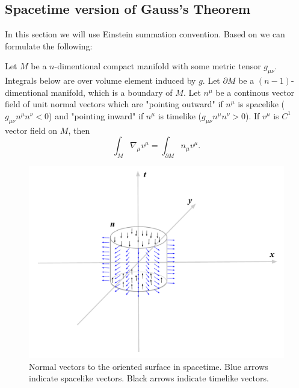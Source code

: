 \documentclass[main.tex]{subfiles}
\begin{document}
\subsection{Spacetime version of Gauss's Theorem}
In this section we will use Einstein summation convention.
Based on \cite[see][Appendix B]{wald1984} we can formulate the following:
\begin{theorem}
\label{guass-theorem-relativistic}
Let $M$ be a $n$-dimentional compact manifold with some metric tensor $g_{\mu\nu}$. Integrals below are over volume element induced by $g$. Let $\partial M$ be a $(n-1)$-dimentional manifold, which is a boundary of $M$. Let $n^\mu$ be a continous vector field of unit normal vectors which are "pointing outward" if $n^\mu$ is spacelike ($g_{\mu\nu}n^\mu n^\nu < 0$) and "pointing inward" if $n^\mu$ is timelike ($g_{\mu\nu}n^\mu n^\nu > 0$). If $v^\mu$ is $C^1$ vector field on $M$, then 
\begin{equation}
\int_M \nabla_\mu v^\mu = \int_{\partial M} n_\mu v^\mu.
\end{equation}
\end{theorem}
\begin{figure}[H]
\centering
\includegraphics[scale=0.5]{figs/SpaceTimeNormal}
\caption{Normal vectors to the oriented surface in spacetime. Blue arrows indicate spacelike vectors. Black arrows indicate timelike vectors.}
\end{figure}
\end{document}

